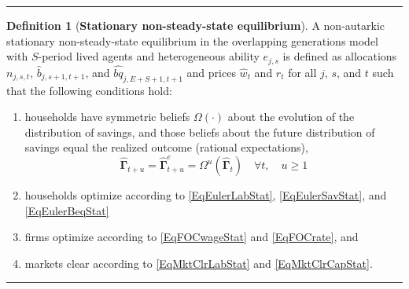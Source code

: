 \documentclass[letterpaper,12pt]{article}
\theoremstyle{definition}
\newtheorem{definition}{Definition} %
\begin{document}
    \hrule
    \begin{definition}[\textbf{Stationary non-steady-state equilibrium}]\label{DefEquilNonSS}
      A non-autarkic stationary non-steady-state equilibrium in the overlapping generations model with $S$-period lived agents and heterogeneous ability $e_{j,s}$ is defined as allocations $n_{j,s,t}$, $\hat{b}_{j,s+1,t+1}$, and $\hat{bq}_{j,E+S+1,t+1}$ and prices $\hat{w}_t$ and $r_t$ for all $j$, $s$, and $t$ such that the following conditions hold:
       \begin{enumerate}
          \item households have symmetric beliefs $\Omega(\cdot)$ about the evolution of the distribution of savings, and those beliefs about the future distribution of savings equal the realized outcome (rational expectations),
            \begin{equation*}
              \bm{\hat{\Gamma}}_{t+u} = \bm{\hat{\Gamma}}^e_{t+u} = \Omega^u\left( \bm{\hat{\Gamma}}_t\right) \quad\forall t, \quad u\geq 1
            \end{equation*}
          \item households optimize according to \eqref{EqEulerLabStat}, \eqref{EqEulerSavStat}, and \eqref{EqEulerBeqStat}
          \item firms optimize according to \eqref{EqFOCwageStat} and \eqref{EqFOCrate}, and
          \item markets clear according to \eqref{EqMktClrLabStat} and \eqref{EqMktClrCapStat}.
       \end{enumerate}
    \end{definition}
    \hrule
\end{document}
